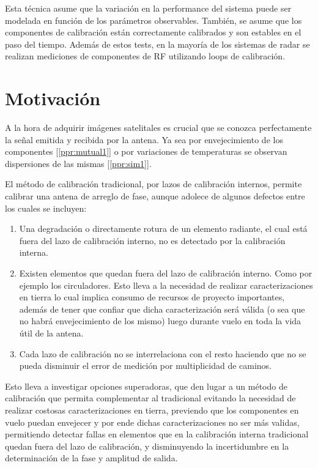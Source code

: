 Esta técnica asume que la variación en la performance del sistema puede ser modelada en función de los parámetros observables. 
También, se asume que los componentes de calibración están correctamente calibrados y son estables en el paso del tiempo. 
Además de estos tests, en la mayoría de los sistemas de radar se realizan mediciones de componentes de RF utilizando loops de 
calibración.
	

\section{Motivación}

A la hora de adquirir imágenes satelitales es crucial que se conozca perfectamente la señal emitida y recibida por la antena. 
Ya sea por envejecimiento de los componentes [\ref{ppr:mutual1}] o por variaciones de temperaturas se observan dispersiones de 
las mismas [\ref{ppr:sim1}]. 

El método de calibración tradicional, por lazos de calibración internos, permite calibrar una antena de arreglo de fase, aunque 
adolece de algunos defectos entre los cuales se incluyen:

\begin{enumerate}
    \item Una degradación o directamente rotura de un elemento radiante, el cual está fuera del lazo de calibración interno, no 
			es detectado por la calibración interna.
    \item Existen elementos que quedan fuera del lazo de calibración interno. Como por ejemplo los circuladores. Esto lleva a 
			la necesidad de realizar caracterizaciones en tierra lo cual implica consumo de recursos de proyecto importantes, 
			además de tener que confiar que dicha caracterización será válida (o sea que no habrá envejecimiento de los mismo) 
			luego durante vuelo en toda la vida útil de la antena.
    \item Cada lazo de calibración no se interrelaciona con el resto haciendo que no se pueda disminuir el error de medición por 
			multiplicidad de caminos.
\end{enumerate}

Esto lleva a investigar opciones superadoras, que den lugar a un método de calibración que permita complementar al tradicional 
evitando la necesidad de realizar costosas caracterizaciones en tierra, previendo que los componentes en vuelo puedan envejecer 
y por ende dichas caracterizaciones no ser más validas, permitiendo detectar fallas en elementos que en la calibración interna 
tradicional quedan fuera del lazo de calibración, y disminuyendo la incertidumbre en la determinación de la fase y amplitud de 
salida.

